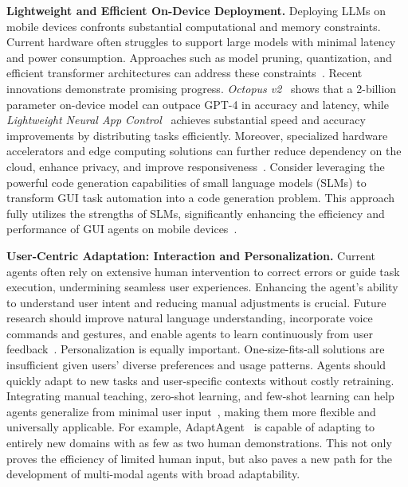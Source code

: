 \noindent\textbf{Lightweight and Efficient On-Device Deployment.}
Deploying LLMs on mobile devices confronts substantial computational and memory constraints. Current hardware often struggles to support large models with minimal latency and power consumption. Approaches such as model pruning, quantization, and efficient transformer architectures can address these constraints~\cite{ding2024mobileagentsop}. 
Recent innovations demonstrate promising progress. \textit{Octopus v2}~\cite{chen2024octopus} shows that a 2-billion parameter on-device model can outpace GPT-4 in accuracy and latency, while \textit{Lightweight Neural App Control}~\cite{christianos2024lightweight} achieves substantial speed and accuracy improvements by distributing tasks efficiently. Moreover, specialized hardware accelerators and edge computing solutions can further reduce dependency on the cloud, enhance privacy, and improve responsiveness~\cite{wang2024mobileagentv2}. 
Consider leveraging the powerful code generation capabilities of small language models (SLMs) to transform GUI task automation into a code generation problem. This approach fully utilizes the strengths of SLMs, significantly enhancing the efficiency and performance of GUI agents on mobile devices~\cite{wen2024autodroidv2, wang2024comprehensive}.



\noindent\textbf{User-Centric Adaptation: Interaction and Personalization.}
Current agents often rely on extensive human intervention to correct errors or guide task execution, undermining seamless user experiences. Enhancing the agent’s ability to understand user intent and reducing manual adjustments is crucial. Future research should improve natural language understanding, incorporate voice commands and gestures, and enable agents to learn continuously from user feedback~\cite{lee2023exploremobilegpt,wang2024mobileagentv1, wang2024mobileagentv2, citation-111}.
Personalization is equally important. One-size-fits-all solutions are insufficient given users’ diverse preferences and usage patterns. Agents should quickly adapt to new tasks and user-specific contexts without costly retraining. Integrating manual teaching, zero-shot learning, and few-shot learning can help agents generalize from minimal user input~\cite{sodhi2024step, lee2023exploremobilegpt,song2024visiontasker,li2024uinav}, making them more flexible and universally applicable.
For example, AdaptAgent~\cite{verma2024adaptagent} is capable of adapting to entirely new domains with as few as two human demonstrations. This not only proves the efficiency of limited human input, but also paves a new path for the development of multi-modal agents with broad adaptability.



